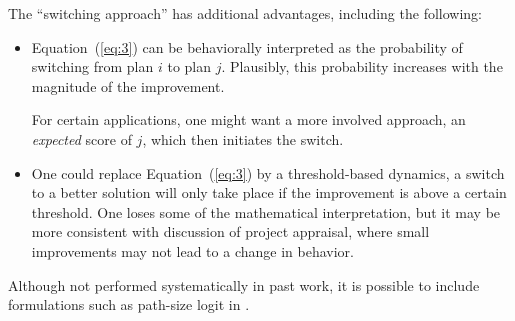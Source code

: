 The ``switching approach'' has additional advantages, including the
following:
\begin{itemize}

\item Equation~(\ref{eq:3}) can be behaviorally interpreted as the
  probability of switching from plan $i$ to plan $j$.  Plausibly, this
  probability increases with the magnitude of the improvement.  

  For certain applications, one might want a more involved approach,
  \eg an \emph{expected} score of $j$, which then initiates the
  switch.

\item One could replace Equation~(\ref{eq:3}) by a threshold-based
  dynamics, \ie a switch to a better solution will only take place
  if the improvement is above a certain threshold.  
 One loses some of the mathematical interpretation, but 
 it may be more consistent with discussion of
  project appraisal, where small improvements may not
  lead to a change in behavior. 


\end{itemize}

Although not performed systematically in past work, it is 
possible to include formulations such as path-size logit 
\citep{ben-akiva-1999} in .



